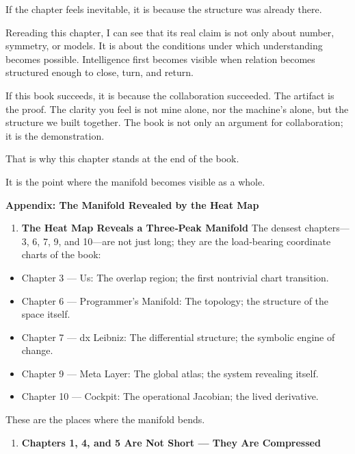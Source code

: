 If the chapter feels inevitable, it is because the structure was already
there.

Rereading this chapter, I can see that its real claim is not only about
number, symmetry, or models. It is about the conditions under which
understanding becomes possible. Intelligence first becomes visible when
relation becomes structured enough to close, turn, and return.

If this book succeeds, it is because the collaboration succeeded. The
artifact is the proof. The clarity you feel is not mine alone, nor the
machine's alone, but the structure we built together. The book is not
only an argument for collaboration; it is the demonstration.

That is why this chapter stands at the end of the book.

It is the point where the manifold becomes visible as a whole.

\newpage
\vspace*{2cm}

\noindent\textbf{\large Appendix: The Manifold Revealed by the Heat Map}

\begin{enumerate}
\def\labelenumi{\arabic{enumi}.}
\tightlist
\item
  \textbf{The Heat Map Reveals a Three‑Peak Manifold} The densest
  chapters---3, 6, 7, 9, and 10---are not just long; they are the
  load‑bearing coordinate charts of the book:
\end{enumerate}

\begin{itemize}
\tightlist
\item
  Chapter 3 --- Us: The overlap region; the first nontrivial chart
  transition.
\item
  Chapter 6 --- Programmer's Manifold: The topology; the structure of
  the space itself.
\item
  Chapter 7 --- dx Leibniz: The differential structure; the symbolic
  engine of change.
\item
  Chapter 9 --- Meta Layer: The global atlas; the system revealing
  itself.
\item
  Chapter 10 --- Cockpit: The operational Jacobian; the lived
  derivative.
\end{itemize}

These are the places where the manifold bends.

\begin{enumerate}
\def\labelenumi{\arabic{enumi}.}
\setcounter{enumi}{1}
\tightlist
\item
  \textbf{Chapters 1, 4, and 5 Are Not Short --- They Are Compressed}
\end{enumerate}

